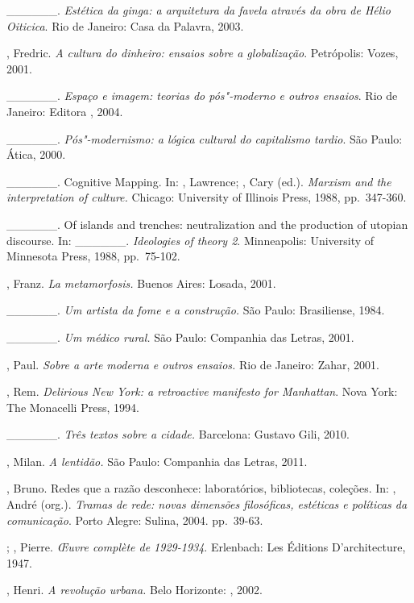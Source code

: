 \begin{Parskip}
\_\_\_\_\_\_. \emph{Estética da ginga: a arquitetura da favela
através da obra de Hélio Oiticica}. Rio de Janeiro: Casa da Palavra,
2003.

, Fredric. \emph{A cultura do dinheiro: ensaios sobre a
globalização}. Petrópolis: Vozes, 2001.

\_\_\_\_\_\_. \emph{Espaço e imagem: teorias do pós"-moderno e
outros ensaios}. Rio de Janeiro: Editora , 2004.

\_\_\_\_\_\_. \emph{Pós"-modernismo: a lógica cultural do
capitalismo tardio}. São Paulo: Ática, 2000.

\_\_\_\_\_\_. Cognitive Mapping. In: , Lawrence; ,
Cary (ed.). \emph{Marxism and the interpretation of culture.} Chicago:
University of Illinois Press, 1988, pp.~347-360.

\_\_\_\_\_\_. Of islands and trenches: neutralization and the
production of utopian discourse. In: \_\_\_\_\_\_.
\emph{Ideologies of theory 2}. Minneapolis: University of Minnesota
Press, 1988, pp.~75-102.

, Franz. \emph{La metamorfosis.} Buenos Aires: Losada, 2001.

\_\_\_\_\_\_. \emph{Um artista da fome e a construção.} São Paulo:
Brasiliense, 1984.

\_\_\_\_\_\_. \emph{Um médico rural.} São Paulo: Companhia das
Letras, 2001.

, Paul. \emph{Sobre a arte moderna e outros ensaios.} Rio de
Janeiro: Zahar, 2001.

, Rem. \emph{Delirious New York: a retroactive manifesto for
Manhattan}. Nova York: The Monacelli Press, 1994.

\_\_\_\_\_\_. \emph{Três textos sobre a cidade.} Barcelona: %
Gustavo Gili, 2010.

, Milan. \emph{A lentidão.} São Paulo: Companhia das Letras,
2011.

, Bruno. Redes que a razão desconhece: laboratórios,
bibliotecas, coleções. In: , André (org.). \emph{Tramas de
rede: novas dimensões filosóficas, estéticas e políticas da
comunicação}. Porto Alegre: Sulina, 2004. pp.~39-63.

; , Pierre. \emph{\OE uvre complète de 1929-1934}.
Erlenbach: Les Éditions D'architecture, 1947.

, Henri. \emph{A revolução urbana.} Belo Horizonte: ,
2002.


\end{Parskip}
